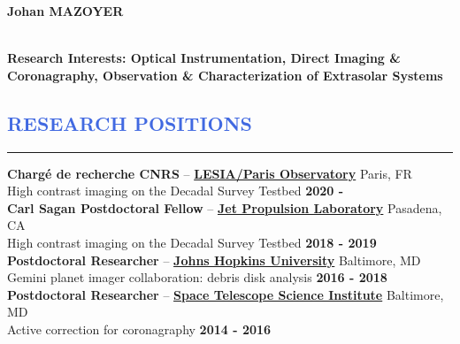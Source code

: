 \documentclass[12pt]{article}
\begin{document}
\lhead[]{}

\begin{huge}
\noindent\textbf{Johan MAZOYER}
\end{huge}\\


\textbf{Research Interests: Optical Instrumentation, Direct Imaging \& Coronagraphy, Observation \& Characterization of Extrasolar Systems}\\


\vspace{-1cm}
\textcolor{RoyalBlue}{\section{\large RESEARCH POSITIONS}
\vspace{-0.35cm}\hrule}
\vspace{0.4cm}

\textbf{Chargé de recherche CNRS} -- \href{http://www.obspm.fr/?lang=en}{\textbf{LESIA/Paris Observatory}} \hfill       { Paris, FR} \\
{\small High contrast imaging on the Decadal Survey Testbed}  \hfill  	 { \bf 2020 - }\\


\textbf{Carl Sagan Postdoctoral Fellow} -- \href{https://www.jpl.nasa.gov/}{\textbf{Jet Propulsion Laboratory}} \hfill       { Pasadena, CA} \\
{\small High contrast imaging on the Decadal Survey Testbed}  \hfill  	 { \bf 2018 - 2019}\\


\textbf{Postdoctoral Researcher} -- \href{http://physics-astronomy.jhu.edu/}{\textbf{Johns Hopkins University}} \hfill       { Baltimore, MD} \\
{\small Gemini planet imager collaboration: debris disk analysis}  \hfill  	 { \bf 2016 - 2018}\\


\textbf{Postdoctoral Researcher} -- {\href{http://www.stsci.edu}{\textbf{Space Telescope Science Institute}}} \hfill       { Baltimore, MD} \\
{\small Active correction for coronagraphy}  \hfill  	 { \bf 2014 - 2016}\\
\end{document}
